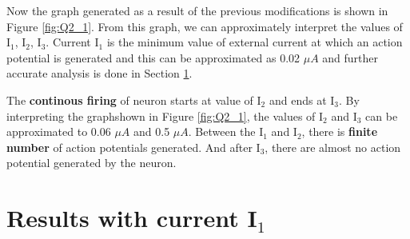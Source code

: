 \documentclass[12pt, a4paper]{article}
\begin{document}
Now the graph generated as a result of the previous modifications is shown in Figure \ref{fig:Q2_1}. From this graph, we can approximately interpret the values of I$_1$, I$_2$, I$_3$. Current I$_1$ is the minimum value of external current at which an action potential is generated and this can be approximated as 0.02 $ \mu A $ and further accurate analysis is done in Section \ref{I1 results}.

The \textbf{continous firing} of neuron starts at value of I$ _2 $ and ends at I$ _3 $. By interpreting the graphshown in Figure \ref{fig:Q2_1}, the values of I$ _2 $ and I$ _3 $ can be approximated to 0.06 $ \mu A $ and 0.5 $ \mu A $. Between the I$ _1 $ and I$ _2 $, there is \textbf{finite number} of action potentials generated.  And after I$ _3 $, there are almost no action potential generated by the neuron.


\section{Results with current I$_1$}
\label {I1 results}
\end{document}
